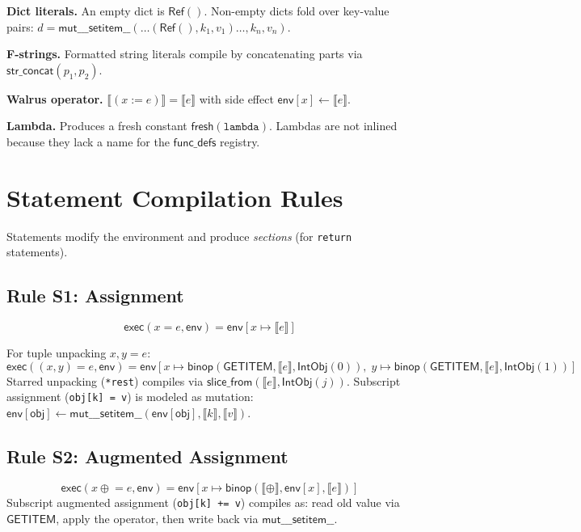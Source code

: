 \documentclass[11pt,a4paper]{report}
\theoremstyle{definition}
\theoremstyle{plain}
\newcommand{\den}[1]{\llbracket #1 \rrbracket}
\begin{document}
\textbf{Dict literals.}  An empty dict is $\mathsf{Ref}()$.
Non-empty dicts fold over key-value pairs:
$d = \mathsf{mut\_\_\_setitem\_\_}(\ldots(\mathsf{Ref}(), k_1, v_1)
\ldots, k_n, v_n)$.

\textbf{F-strings.}  Formatted string literals compile by
concatenating parts via $\mathsf{str\_concat}(p_1, p_2)$.

\textbf{Walrus operator.}  $\den{(x \mathop{:=} e)} = \den{e}$
with side effect $\mathsf{env}[x] \leftarrow \den{e}$.

\textbf{Lambda.}  Produces a fresh constant $\mathsf{fresh}(\texttt{lambda})$.
Lambdas are not inlined because they lack a name
for the $\mathsf{func\_defs}$ registry.


\section{Statement Compilation Rules}

Statements modify the environment and produce \emph{sections} (for
\texttt{return} statements).

\subsection{Rule S1: Assignment}
\[
  \mathsf{exec}(x = e, \mathsf{env}) = \mathsf{env}[x \mapsto \den{e}]
\]

For tuple unpacking $x, y = e$:
\[
  \mathsf{exec}((x, y) = e, \mathsf{env}) = \mathsf{env}[
    x \mapsto \mathsf{binop}(\mathsf{GETITEM}, \den{e},
      \mathsf{IntObj}(0)),\;
    y \mapsto \mathsf{binop}(\mathsf{GETITEM}, \den{e},
      \mathsf{IntObj}(1))]
\]
Starred unpacking (\texttt{*rest}) compiles via
$\mathsf{slice\_from}(\den{e}, \mathsf{IntObj}(j))$.
Subscript assignment (\texttt{obj[k] = v}) is modeled as mutation:
$\mathsf{env}[\mathsf{obj}] \leftarrow
\mathsf{mut\_\_\_setitem\_\_}(\mathsf{env}[\mathsf{obj}], \den{k}, \den{v})$.

\subsection{Rule S2: Augmented Assignment}
\[
  \mathsf{exec}(x \mathrel{\oplus}= e, \mathsf{env}) = \mathsf{env}[
    x \mapsto \mathsf{binop}(\llbracket \oplus \rrbracket,
    \mathsf{env}[x], \den{e})]
\]
Subscript augmented assignment (\texttt{obj[k] += v}) compiles as:
read old value via $\mathsf{GETITEM}$, apply the operator, then
write back via $\mathsf{mut\_\_\_setitem\_\_}$.
\end{document}
